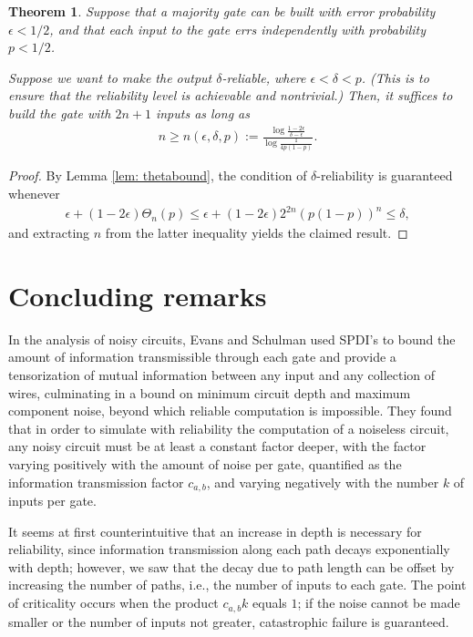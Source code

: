 \documentclass[12pt,reqno]{amsart}
\theoremstyle{plain} %
\newtheorem{theorem}{Theorem}[section]
\theoremstyle{remark}
\theoremstyle{definition}
\begin{document}
\begin{theorem}
     Suppose that a majority gate can be built with error probability $\epsilon<1/2$, and that each input to the gate errs independently with probability $p<1/2$. 
    
    Suppose we want to make the output $\delta$-reliable, where $\epsilon<\delta<p$. (This is to ensure that the reliability level is achievable and nontrivial.) Then, it suffices to build the gate with $2n+1$ inputs as long as
    \begin{align}
        n\ge n(\epsilon,\delta,p):=\frac{\log\frac{1-2\epsilon}{\delta-\epsilon}}{\log \frac{1}{4p(1-p)}}.
    \end{align}
\end{theorem}
\begin{proof}
   By Lemma \ref{lem: thetabound}, the condition of $\delta$-reliability is guaranteed whenever
    \begin{align}
        \epsilon+(1-2\epsilon)\Theta_n(p)\le\epsilon+(1-2\epsilon)2^{2n}(p(1-p))^n\le\delta,
    \end{align}
    and extracting $n$ from the latter inequality yields the claimed result.
\end{proof}

\section{Concluding remarks}

In the analysis of noisy circuits, Evans and Schulman used SPDI's to bound the amount of information transmissible through each gate and provide a tensorization of mutual information between any input and any collection of wires, culminating in a bound on minimum circuit depth and maximum component noise, beyond which reliable computation is impossible. They found that in order to simulate with reliability the computation of a noiseless circuit, any noisy circuit must be at least a constant factor deeper, with the factor varying positively with the amount of noise per gate, quantified as the information transmission factor $c_{a,b}$, and varying negatively with the number $k$ of inputs per gate. 

It seems at first counterintuitive that an increase in depth is necessary for reliability, since information transmission along each path decays exponentially with depth; however, we saw that the decay due to path length can be offset by increasing the number of paths, i.e., the number of inputs to each gate. The point of criticality occurs when the product $c_{a,b}k$ equals $1$; if the noise cannot be made smaller or the number of inputs not greater, catastrophic failure is guaranteed.
\end{document}
